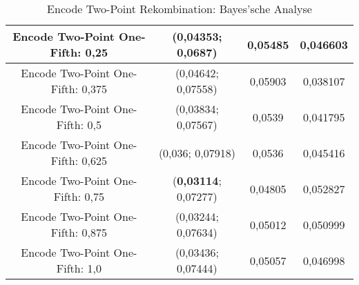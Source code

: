 \begin{table}[H]
\begin{tabular}{c | c | c | c}
		\hline
		Encode Two-Point One-Fifth: 0,25 & \color{Green}(0,04353; 0,0687)\color{black} & 0,05485 & 0,046603\\
		\hline
		Encode Two-Point One-Fifth: 0,375 & \color{Green}(0,04642; 0,07558)\color{black} & 0,05903 & 0,038107\\
		\hline
		Encode Two-Point One-Fifth: 0,5 & (0,03834; 0,07567) & 0,0539 & 0,041795\\
		\hline
		Encode Two-Point One-Fifth: 0,625 & (0,036; 0,07918) & 0,0536 & 0,045416\\
		\hline
		Encode Two-Point One-Fifth: 0,75 & (\textbf{0,03114}; 0,07277) & 0,04805 & \color{Green}0,052827\color{black}\\
		\hline
		Encode Two-Point One-Fifth: 0,875 & (0,03244; 0,07634) & 0,05012 & 0,050999\\
		\hline
		Encode Two-Point One-Fifth: 1,0 & (0,03436; 0,07444) & 0,05057 & 0,046998\\
	\end{tabular}
	\caption{Encode Two-Point Rekombination: Bayes'sche Analyse}
	\label{table:encodeTwoPointBayesian}
\end{table}
